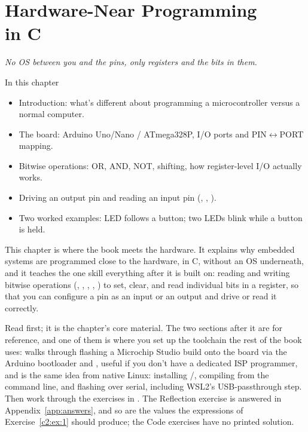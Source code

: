
\chapter[Hardware-Near Programming in C]{Hardware-Near Programming\\in C}
\label{c2:ch}

{\large\itshape No OS between you and the pins, only registers and the bits in them.\par}

\begin{chapterbox}{In this chapter}
\begin{itemize}
  \item Introduction: what's different about programming a microcontroller versus a normal
    computer.
  \item The board: Arduino Uno/Nano / ATmega328P, I/O ports and PIN$\leftrightarrow$PORT mapping.
  \item Bitwise operations: OR, AND, NOT, shifting, how register-level I/O actually works.
  \item Driving an output pin and reading an input pin (, , ).
  \item Two worked examples: LED follows a button; two LEDs blink while a button is held.
\end{itemize}
\end{chapterbox}

This chapter is where the book meets the hardware. It explains why embedded systems are programmed
close to the hardware, in C, without an OS underneath, and it teaches the one skill everything after
it is built on: reading and writing bitwise operations (\code{|}, \code{&}, \code{~}, \code{<<},
\code{>>}) to set, clear, and read individual bits in a register, so that you can configure a pin as
an input or an output and drive or read it correctly.

Read  first; it is the chapter's core material. The two sections after it
are for reference, and one of them is where you set up the toolchain the rest of the book uses:
 walks through flashing a Microchip Studio build onto the board via the Arduino
bootloader and , useful if you don't have a dedicated ISP programmer, and
 is the same idea from native Linux: installing /,
compiling from the command line, and flashing over serial, including WSL2's USB-passthrough step.
Then work through the exercises in . The Reflection exercise is answered in
Appendix~\ref{app:answers}, and so are the values the expressions of Exercise~\ref{c2:ex:1} should
produce; the Code exercises have no printed solution.






